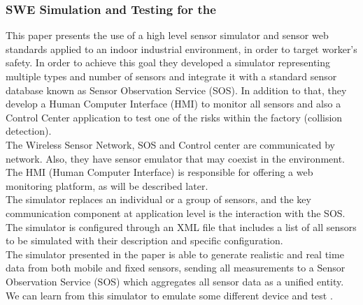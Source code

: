 \subsubsection{SWE Simulation and Testing for the \IoT}\cite{Paper3}
This paper presents the use of a high level sensor simulator and sensor web standards applied to an indoor industrial environment, in order to target worker's safety. In order to achieve this goal they developed a simulator representing multiple types and number of sensors and integrate it with a standard sensor database known as Sensor Observation Service (SOS). In addition to that, they develop a Human Computer Interface (HMI) to monitor all sensors and also a Control Center application to test one of the risks within the factory (collision detection).\\
The Wireless Sensor Network, SOS and Control center are communicated by network. Also, they have sensor emulator that may coexist in the environment. The HMI (Human Computer Interface) is responsible for offering a web monitoring platform, as will be described later.\\
The simulator replaces an individual or a group of sensors, and the key communication component at application level is the interaction with the SOS. \\
The simulator is configured through an XML file that includes a list of all sensors to be simulated with their description and specific configuration.\\
The simulator presented in the paper is able to generate realistic and real time data from both mobile and fixed sensors, sending all measurements to a Sensor Observation Service (SOS) which aggregates all sensor data as a unified entity. \\
We can learn from this simulator to emulate some different device and test \IoT.\\

